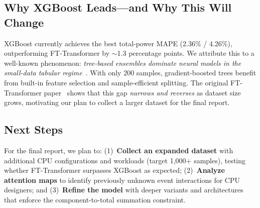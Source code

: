 \documentclass[10pt,twocolumn,letterpaper]{article}
\begin{document}
\subsection{Why XGBoost Leads---and Why This Will Change}

XGBoost currently achieves the best total-power MAPE (2.36\% / 4.26\%),
outperforming FT-Transformer by $\sim$1.3 percentage points.  We attribute
this to a well-known phenomenon: \emph{tree-based ensembles dominate
neural models in the small-data tabular
regime}~\cite{gorishniy2021ft_transformer}.  With only 200 samples,
gradient-boosted trees benefit from built-in feature selection and
sample-efficient splitting.  The original FT-Transformer
paper~\cite{gorishniy2021ft_transformer} shows that this gap
\emph{narrows and reverses} as dataset size grows, motivating our plan to
collect a larger dataset for the final report.

\subsection{Next Steps}

For the final report, we plan to:
(1)~\textbf{Collect an expanded dataset} with additional CPU configurations
and workloads (target 1{,}000+ samples), testing whether FT-Transformer
surpasses XGBoost as expected;
(2)~\textbf{Analyze attention maps} to identify previously unknown event
interactions for CPU designers; and
(3)~\textbf{Refine the model} with deeper variants and architectures that
enforce the component-to-total summation constraint.

{\small


}
\end{document}
